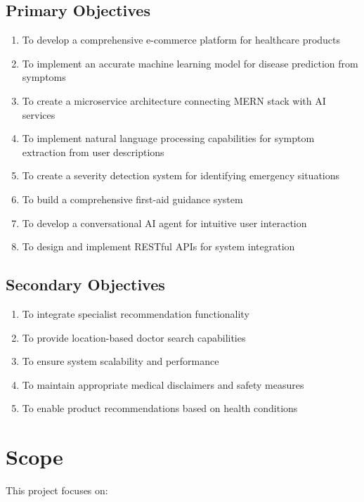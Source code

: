 \documentclass[12pt,a4paper]{article}
\begin{document}
\subsection{Primary Objectives}
\begin{enumerate}
    \item To develop a comprehensive e-commerce platform for healthcare products
    \item To implement an accurate machine learning model for disease prediction from symptoms
    \item To create a microservice architecture connecting MERN stack with AI services
    \item To implement natural language processing capabilities for symptom extraction from user descriptions
    \item To create a severity detection system for identifying emergency situations
    \item To build a comprehensive first-aid guidance system
    \item To develop a conversational AI agent for intuitive user interaction
    \item To design and implement RESTful APIs for system integration
\end{enumerate}

\subsection{Secondary Objectives}
\begin{enumerate}
    \item To integrate specialist recommendation functionality
    \item To provide location-based doctor search capabilities
    \item To ensure system scalability and performance
    \item To maintain appropriate medical disclaimers and safety measures
    \item To enable product recommendations based on health conditions
\end{enumerate}

\section{Scope}
This project focuses on:
\end{document}
